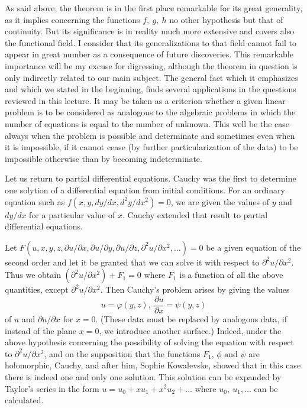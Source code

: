 \documentclass[12pt,oneside]{book}
\begin{document}
As said above, the theorem is in the first place remarkable for its great generality, as it implies concerning the functions $f,\ g,\ h$ no other hypothesis but that of continuity. But its significance is in reality much more extensive and covers also the functional field. I consider that its generalizations to that field cannot fail to appear in great number as a consequence of future discoveries. This remarkable importance will be my excuse for digressing, although the theorem in question is only indirectly related to our main subject. The general fact which it emphasizes and which we stated in the beginning, finds several applications in the questions reviewed in this lecture. It may be taken as a criterion whether a given linear problem is to be considered as analogous to the algebraic problems in which the number of equations is equal to the number of unknown. This well be the case always when the problem is possible and determinate and sometimes even when it is impossible, if it cannot cease (by further particularization of the data) to be impossible otherwise than by becoming indeterminate.\label{pg4} \par

Let us return to partial differential equations. Cauchy was the first to determine one solytion of a differential equation from initial conditions. For an ordinary equation such as $f(x,y,dy/dx,d^2y/dx^2)=0$, we are given the values of $y$ and $dy/dx$ for a particular value of $x$. Cauchy extended that result to partial differential equations. \par

Let $F(u,x,y,z,\partial u/\partial x, \partial u/\partial y, \partial u/\partial z,\partial^2u/\partial x^2,\dots)=0$ be a given equation of the second order and let it be granted that we can solve it with respect to $\partial^2u/\partial x^2$. Thus we obtain $(\partial^2u/\partial x^2) + F_1 =0$ where $F_1$ is a function of all the above quantities, except $\partial^2u/\partial x^2$. Then Cauchy's problem arises by giving the values
\begin{equation}
    \label{eq3}
    u=\varphi (y,z),\ \frac{\partial u}{\partial x}=\psi(y,z)
\end{equation}
of $u$ and $\partial u/\partial x$ for $x=0$. (These data must be replaced by analogous data, if instead of the plane $x=0$, we introduce another surface.) Indeed, under the above hypothesis concerning the possibility of solving the equation with respect to $\partial^2 u/\partial x^2$, and on the supposition that the functions $F_1$, $\phi \text{ and } \psi$ are holomorphic, Cauchy, and after him, Sophie Kowalevske, showed that in this case there is indeed one and only one solution. This solution can be expanded by Taylor's series in the form $u=u_0+xu_1+x^2u_2+ \dots$ where $u_0,\ u_1, \dots$ can be calculated. \par
\end{document}

